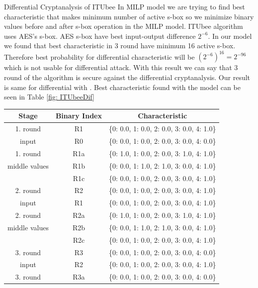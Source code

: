 \begin{section}{Differential Cryptanalysis of ITUbee}
In MILP model we are trying to find best characteristic that makes minimum number of active s-box so we minimize binary values before and after s-box operation in the MILP model. ITUbee algorithm uses AES's \cite{dworkin2001advanced} s-box. AES s-box have best input-output difference $2^{-6}$. In our model we found that best characteristic in 3 round have minimum 16 active s-box. Therefore best probability for differential characteristic will be $(2^{-6})^{16}= 2^{-96}  $ which is not usable for differential attack. With this result we can say that 3 round of the algorithm is secure against the differential cryptanalysis. Our result is same for differential with \cite{karakocc2013itubee}. Best characteristic found with the model can be seen in Table \ref{fig: ITUbeeDif}

\begin{table}[H]
    \centering
    \begin{tabular}{|c|c|c|}
        \hline
        \textbf{Stage} & \textbf{Binary Index} & \textbf{Characteristic} \\
        \hline
        1. round  & R1 & \{0: 0.0, 1: 0.0, 2: 0.0, 3: 0.0, 4: 1.0\} \\
        input      & R0 & \{0: 0.0, 1: 0.0, 2: 0.0, 3: 0.0, 4: 0.0\} \\
        \hline
        1. round  & R1a & \{0: 1.0, 1: 0.0, 2: 0.0, 3: 1.0, 4: 1.0\} \\
        middle values   & R1b & \{0: 0.0, 1: 1.0, 2: 1.0, 3: 0.0, 4: 1.0\} \\
                   & R1c & \{0: 0.0, 1: 0.0, 2: 0.0, 3: 0.0, 4: 1.0\} \\
        \hline
        2. round& R2 & \{0: 0.0, 1: 0.0, 2: 0.0, 3: 0.0, 4: 1.0\} \\
        input      & R1 & \{0: 0.0, 1: 0.0, 2: 0.0, 3: 0.0, 4: 1.0\} \\
        \hline
        2. round & R2a & \{0: 1.0, 1: 0.0, 2: 0.0, 3: 1.0, 4: 1.0\} \\
        middle values  & R2b & \{0: 0.0, 1: 1.0, 2: 1.0, 3: 0.0, 4: 1.0\} \\
                   & R2c & \{0: 0.0, 1: 0.0, 2: 0.0, 3: 0.0, 4: 1.0\} \\
        \hline
        3. round  & R3 & \{0: 0.0, 1: 0.0, 2: 0.0, 3: 0.0, 4: 0.0\} \\
        input     & R2 & \{0: 0.0, 1: 0.0, 2: 0.0, 3: 0.0, 4: 1.0\} \\
        \hline
        3. round  & R3a & \{0: 0.0, 1: 0.0, 2: 0.0, 3: 0.0, 4: 0.0\} \\

\end{tabular}
\end{table}
\end{section}
